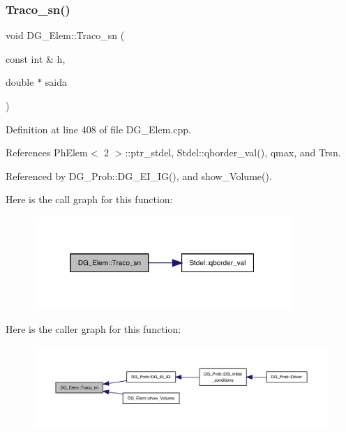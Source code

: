 \subsubsection{\texorpdfstring{Traco\+\_\+sn()}{Traco\_sn()}}
{\footnotesize\ttfamily void D\+G\+\_\+\+Elem\+::\+Traco\+\_\+sn (\begin{DoxyParamCaption}\item[{const int \&}]{h,  }\item[{double $\ast$}]{saida }\end{DoxyParamCaption})}



Definition at line 408 of file D\+G\+\_\+\+Elem.\+cpp.



References Ph\+Elem$<$ 2 $>$\+::ptr\+\_\+stdel, Stdel\+::qborder\+\_\+val(), qmax, and Trsn.



Referenced by D\+G\+\_\+\+Prob\+::\+D\+G\+\_\+\+E\+I\+\_\+\+I\+G(), and show\+\_\+\+Volume().

Here is the call graph for this function\+:
\nopagebreak
\begin{figure}[H]
\begin{center}
\leavevmode
\includegraphics[width=277pt]{classDG__Elem_a4b5b26372a103e9f10c9d518419d4fd1_cgraph}
\end{center}
\end{figure}
Here is the caller graph for this function\+:
\nopagebreak
\begin{figure}[H]
\begin{center}
\leavevmode
\includegraphics[width=350pt]{classDG__Elem_a4b5b26372a103e9f10c9d518419d4fd1_icgraph}
\end{center}
\end{figure}
\mbox{\label{classPhElem_a09b6787e5e42496ece86754bbb2ae59c}} 
